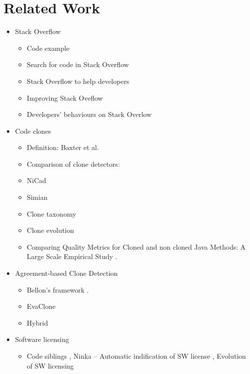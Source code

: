 \documentclass{sig-alternate-05-2015}
\begin{document}
\section{Related Work}
\begin{itemize}
	\item Stack Overflow
	\begin{itemize}
		\item Code example \cite{Nasehi2012}
		\item Search for code in Stack Overflow \cite{Diamantopoulos2015,Keivanloo2014,Park2014, Stolee2014}
		\item Stack Overflow to help developers \cite{Ponzanelli2013, Ponzanelli2014}
		\item Improving Stack Oveflow \cite{Diamantopoulos2015, Wang2014, Bosu2013}
		\item Developers' behaviours on Stack Overlow \cite{Wang2013, Movshovitz-Attias2013}
	\end{itemize}
	\item Code clones 
		\begin{itemize}
			\item Definition: Baxter et al. \cite{Baxter1998}
			\item Comparison of clone detectors: \cite{Roy2008, Ragkhitwetsagul2016,Svajlenko2014}
			\item NiCad \cite{Roy2008,Cordy}
			\item Simian \cite{simian}
			\item Clone taxonomy \cite{Kapser2003}
			\item Clone evolution \cite{Pate2013,Mondal2011}
			\item Comparing Quality Metrics for Cloned and non cloned Java Methods: A Large Scale Empirical Study \cite{Saini2016}.
		\end{itemize}
	\item Agreement-based Clone Detection
	\begin{itemize}
		\item Bellon's framework \cite{Bellon2007}.
		\item EvaClone \cite{Wang2013}
		\item Hybrid \cite{Funaro2010}
	\end{itemize}
	\item Software licensing
	\begin{itemize}
		\item Code siblings \cite{German2009}, Ninka -- Automatic indification of SW license \cite{German2010}, Evolution of SW licensing \cite{DiPenta2010}
	\end{itemize}

\end{itemize}
\end{document}
